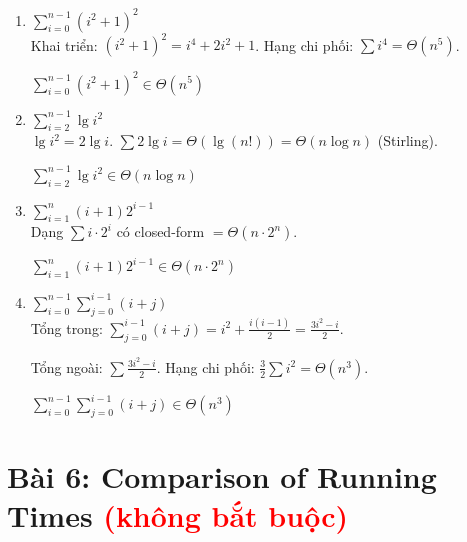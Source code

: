 \documentclass[12pt,a4paper]{article}
\begin{document}
\begin{enumerate}[label=\textbf{\alph*.}]

  \item $\displaystyle\sum_{i=0}^{n-1}(i^2+1)^2$ \\[4pt]
  Khai triển: $(i^2+1)^2 = i^4 + 2i^2 + 1$. Hạng chi phối: $\sum i^4 = \Theta(n^5)$.

  \begin{resultbox}
  $\displaystyle\sum_{i=0}^{n-1}(i^2+1)^2 \in \Theta(n^5)$
  \end{resultbox}

  \bigskip

  \item $\displaystyle\sum_{i=2}^{n-1}\lg i^2$ \\[4pt]
  $\lg i^2 = 2\lg i$. $\sum 2\lg i = \Theta(\lg(n!)) = \Theta(n\log n)$ (Stirling).

  \begin{resultbox}
  $\displaystyle\sum_{i=2}^{n-1}\lg i^2 \in \Theta(n\log n)$
  \end{resultbox}

  \bigskip

  \item $\displaystyle\sum_{i=1}^{n}(i+1)2^{i-1}$ \\[4pt]
  Dạng $\sum i \cdot 2^i$ có closed-form $= \Theta(n \cdot 2^n)$.

  \begin{resultbox}
  $\displaystyle\sum_{i=1}^{n}(i+1)2^{i-1} \in \Theta(n \cdot 2^n)$
  \end{resultbox}

  \bigskip

  \item $\displaystyle\sum_{i=0}^{n-1}\sum_{j=0}^{i-1}(i+j)$ \\[4pt]
  Tổng trong: $\sum_{j=0}^{i-1}(i+j) = i^2 + \frac{i(i-1)}{2} = \frac{3i^2 - i}{2}$.

  Tổng ngoài: $\sum \frac{3i^2-i}{2}$. Hạng chi phối: $\frac{3}{2}\sum i^2 = \Theta(n^3)$.

  \begin{resultbox}
  $\displaystyle\sum_{i=0}^{n-1}\sum_{j=0}^{i-1}(i+j) \in \Theta(n^3)$
  \end{resultbox}

\end{enumerate}

\newpage
\section{Bài 6: Comparison of Running Times {\small\textcolor{red}{(không bắt buộc)}}}
\end{document}
